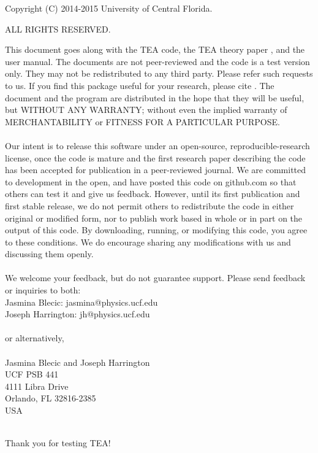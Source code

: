 \newpage

\clearpage
\vspace*{\fill}
\begin{center}
\begin{minipage}{.8\textwidth}


\centerline{Copyright (C) 2014-2015 University of Central Florida.}
\centerline{ALL RIGHTS RESERVED.}

\vspace{20pt} This document goes along with the TEA code, the TEA theory
paper \citep{BlecicEtal2015-TEAtheory}, and the user manual.  The
documents are not peer-reviewed and the code is a test version
only. They may not be redistributed to any third party.  Please refer
such requests to us.  If you find this package useful for your
research, please cite \citet{BlecicEtal2015-TEAtheory}.  The document
and the program are distributed in the hope that they will be useful,
but WITHOUT ANY WARRANTY; without even the implied warranty of
MERCHANTABILITY or FITNESS FOR A PARTICULAR PURPOSE. \\ \\ Our intent
is to release this software under an open-source,
reproducible-research license, once the code is mature and the first
research paper describing the code has been accepted for publication
in a peer-reviewed journal.  We are committed to development in the
open, and have posted this code on github.com so that others can test
it and give us feedback.  However, until its first publication and
first stable release, we do not permit others to redistribute the code
in either original or modified form, nor to publish work based in
whole or in part on the output of this code.  By downloading, running,
or modifying this code, you agree to these conditions.  We do
encourage sharing any modifications with us and discussing them
openly.\\ \\ We welcome your feedback, but do not guarantee
support. Please send feedback or inquiries to both:
\\ Jasmina Blecic: jasmina@physics.ucf.edu \\ Joseph Harrington:
jh@physics.ucf.edu \\ \\ or alternatively, \\ \\ Jasmina Blecic and
Joseph Harrington \\ UCF PSB 441 \\ 4111 Libra Drive
\\ Orlando, FL 32816-2385 \\ USA \\ \\ \centerline{Thank you for
  testing TEA!}
\end{minipage}
\end{center}
\vfill %
\clearpage



